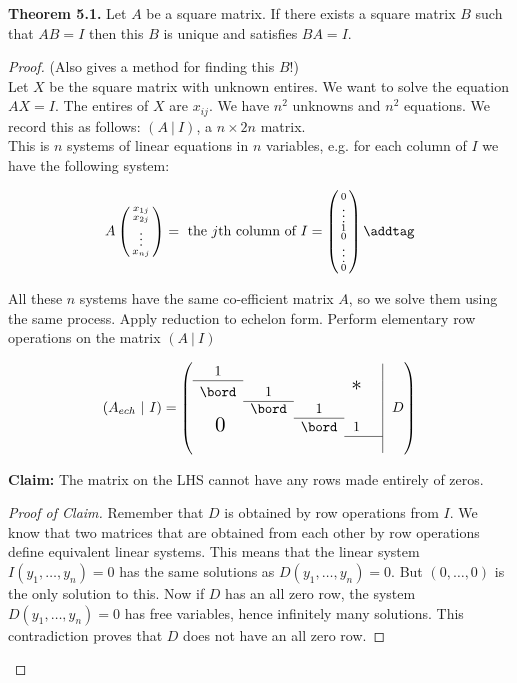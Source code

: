 \noindent \textbf{Theorem 5.1.} Let $A$ be a square matrix. If there exists a square matrix $B$ such that $AB = I$ then this $B$ is unique and satisfies $BA = I$.
\begin{proof}
(Also gives a method for finding this $B$!)\\	Let $X$ be the square matrix with unknown entires. We want to solve the equation $AX = I$. The entires of $X$ are $x_{ij}$. We have $n^2$ unknowns and $n^2$ equations. We record this as follows: $(A ~|~ I)$, a $n \times 2n$ matrix.\\

This is $n$ systems of linear equations in $n$ variables, e.g. for each column of $I$ we have the following system:

\[A\left(\begin{smallmatrix}
x_{1j}\\x_{2j}\\ \vdots \\ x_{nj}	
\end{smallmatrix}
\right)= \text{ the } j\text{th column of } I = \left(\begin{smallmatrix}
0\\ \vdots \\ 1 \\ 0 \\ \vdots \\ 0
\end{smallmatrix}\right)  \addtag
\] 

All these $n$ systems have the same co-efficient matrix $A$, so we solve them using the same process. Apply reduction to echelon form. Perform elementary row operations on the matrix $(A ~|~ I)$

\[(A_{ech} ~|~ I) =\left(
    \begin{array}{ccccc |}
    1    &       &    &     & \\ \cline{1-1}
    \bord & 1       &    &  \scalebox{1.5}{*}   & \\ \cline{2-2}
          & \bord    & 1     &    & \\ \cline{3-3}
       ~\scalebox{1.5}{$0$}   &  & \bord & 1     &  \\ \cline{4-5}
          &          &       &  &  \\ %
  \end{array} ~~D \right) \]

\noindent \textbf{Claim:} The matrix on the LHS cannot have any rows made entirely of zeros.
\begin{proof}[Proof of Claim]
Remember that $D$ is obtained by row operations from $I$. We know that two matrices that are obtained from each other by row operations define equivalent linear systems. This means that the linear system $I(y_1,\dots,y_n) = 0$ has the same solutions as $D(y_1,\dots,y_n) = 0$. But $(0,\dots,0)$ is the only solution to this. Now if $D$ has an all zero row, the system $D(y_1,\dots,y_n) = 0$ has free variables, hence infinitely many solutions. This contradiction proves that $D$ does not have an all zero row. 
\end{proof}


\end{proof}
